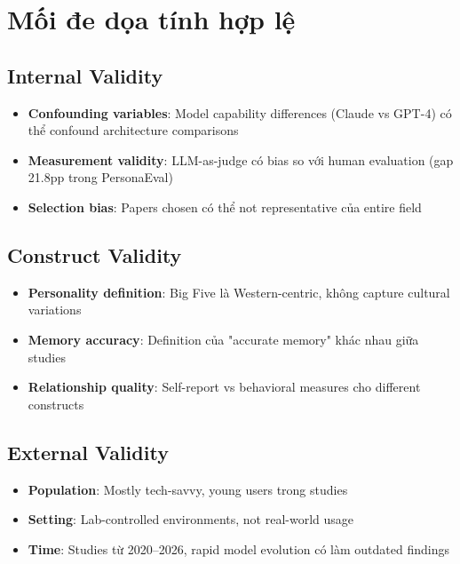 \section{Mối đe dọa tính hợp lệ}

\subsection{Internal Validity}

\begin{itemize}
    \item \textbf{Confounding variables}: Model capability differences (Claude vs GPT-4) có thể confound architecture comparisons
    \item \textbf{Measurement validity}: LLM-as-judge có bias so với human evaluation (gap 21.8pp trong PersonaEval)
    \item \textbf{Selection bias}: Papers chosen có thể not representative của entire field
\end{itemize}

\subsection{Construct Validity}

\begin{itemize}
    \item \textbf{Personality definition}: Big Five là Western-centric, không capture cultural variations
    \item \textbf{Memory accuracy}: Definition của "accurate memory" khác nhau giữa studies
    \item \textbf{Relationship quality}: Self-report vs behavioral measures cho different constructs
\end{itemize}

\subsection{External Validity}

\begin{itemize}
    \item \textbf{Population}: Mostly tech-savvy, young users trong studies
    \item \textbf{Setting}: Lab-controlled environments, not real-world usage
    \item \textbf{Time}: Studies từ 2020--2026, rapid model evolution có làm outdated findings
\end{itemize}

